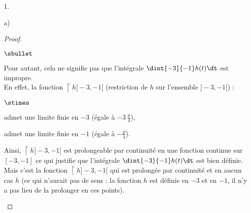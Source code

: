 \documentclass[11pt]{article}%
\begin{document}
\begin{noliste}{1.}
\begin{noliste}{a)}
\begin{proof}
\begin{remark}
\begin{noliste}{$\sbullet$}
        \item Pour autant, cela ne signifie pas que l'intégrale
          $\dint{-3}{-1} h(t) \dt$ est impropre.\\
          En effet, la fonction $\restriction{h}{]-3, -1[}$
          (restriction de $h$ sur l'ensemble $]-3, -1[$) :
          \begin{noliste}{$\stimes$}
          \item admet une limite finie en $-3$ (égale à $-3 \
            \frac{p}{4}$),
          \item admet une limite finie en $-1$ (égale à $-
            \frac{p}{4}$).
          \end{noliste}
          Ainsi, $\restriction{h}{]-3, -1[}$ est prolongeable par
          continuité en une fonction continue sur $[-3, -1]$ ce qui
          justifie que l'intégrale $\dint{-3}{-1} h(t) \dt$ est bien
          définie. \\
          Mais c'est la fonction $\restriction{h}{]-3, -1[}$ qui est
          prolongée par continuité et en aucun cas $h$ (ce qui
          n'aurait pas de sens : la fonction $h$ est définie en $-3$
          et en $-1$, il n'y a pas lieu de la prolonger en ces
          points).
          

\end{noliste}
\end{remark}
\end{proof}
\end{noliste}
\end{noliste}
\end{document}
